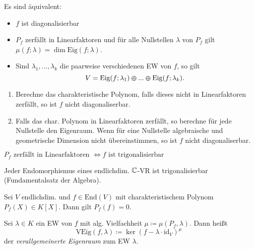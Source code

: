 \documentclass{cheat-sheet}
\newcommand{\End}{\mathrm{End}}
\newcommand{\Eig}{\mathrm{Eig}}
\newcommand{\VEig}{\mathrm{VEig}}
\newcommand{\id}{\mathrm{id}}
\begin{document}
\begin{satz}
Es sind äquivalent:
\begin{itemize}
  \item $f$ ist diagonalisierbar
  \item $P_f$ zerfällt in Linearfaktoren und für alle Nullstellen $\lambda$ von $P_f$ gilt $\mu(f; \lambda) = \dim \Eig(f; \lambda)$.
  \item Sind $\lambda_1, ..., \lambda_k$ die paarweise verschiedenen EW von $f$, so gilt
  \[ V = \Eig(f; \lambda_1) \varoplus ... \varoplus \Eig(f; \lambda_k). \]
\end{itemize}
\end{satz}

\begin{verf}
\begin{enumerate}
  \item Berechne das charakteristische Polynom, falls dieses nicht in Linearfaktoren zerfällt, so ist $f$ nicht diagonaliserbar.
  \item Falls das char. Polynom in Linearfaktoren zerfällt, so berechne für jede Nullstelle den Eigenraum. Wenn für eine Nullstelle algebraische und geometrische Dimension nicht übereinstimmen, so ist $f$ nicht diagonaliserbar.
\end{enumerate}
\end{verf}

\begin{satz}
$P_f \text{ zerfällt in Linearfaktoren } \iff f \text{ ist trigonalisierbar }$
\end{satz}


\begin{kor}
Jeder Endomorphismus eines endlichdim. $\mathbb{C}$-VR ist trigonalisierbar (Fundamentalsatz der Algebra).
\end{kor}


\begin{satz}
Sei $V$ endlichdim. und $f \in \End(V)$ mit charakteristischem Polynom $P_f(X) \in K[X]$. Dann gilt $P_f(f) = 0$.
\end{satz}

\begin{defn}
Sei $\lambda \in K$ ein EW von $f$ mit alg. Vielfachheit $\mu \coloneqq \mu(P_f, \lambda)$. Dann heißt
\[ \VEig(f, \lambda) \coloneqq \ker(f - \lambda \cdot \id_V)^{\mu} \]
der \emph{verallgemeinerte Eigenraum} zum EW $\lambda$.
\end{defn}
\end{document}
